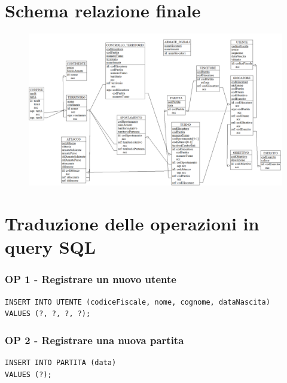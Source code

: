 \documentclass[a4paper,12pt]{report}
\begin{document}
\pagebreak

\section{Schema relazione finale}

\begin{figure}[H]
\centering{}
\begin{center}
\includegraphics[width=\textwidth]{img/report/relFinale.png}
\end{center}
\label{img:schemaRelFinale}
\end{figure}

\pagebreak

\section{Traduzione delle operazioni in query SQL}

\subsubsection{OP 1 - Registrare un nuovo utente}

\begin{verbatim}
INSERT INTO UTENTE (codiceFiscale, nome, cognome, dataNascita)
VALUES (?, ?, ?, ?);
\end{verbatim}

\subsubsection{OP 2 - Registrare una nuova partita}

\begin{verbatim}
INSERT INTO PARTITA (data)
VALUES (?);
\end{verbatim}
\end{document}
